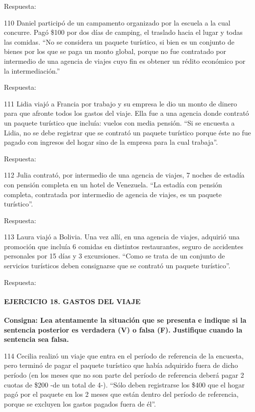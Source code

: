\documentclass[
  openany]{book}
\begin{document}
Respuesta:

110 Daniel participó de un campamento organizado por la escuela a la cual concurre. Pagó \$100 por dos días de camping, el traslado hacia el lugar y todas las comidas. ``No se considera un paquete turístico, si bien es un conjunto de bienes por los que se paga un monto global, porque no fue contratado por intermedio de una agencia de viajes cuyo fin es obtener un rédito económico por la intermediación.''

Respuesta:

111 Lidia viajó a Francia por trabajo y su empresa le dio un monto de dinero para que afronte todos los gastos del viaje. Ella fue a una agencia donde contrató un paquete turístico que incluía: vuelos con media pensión. ``Si se encuesta a Lidia, no se debe registrar que se contrató un paquete turístico porque éste no fue pagado con ingresos del hogar sino de la empresa para la cual trabaja''.

Respuesta:

112 Julia contrató, por intermedio de una agencia de viajes, 7 noches de estadía con pensión completa en un hotel de Venezuela. ``La estadía con pensión completa, contratada por intermedio de agencia de viajes, es un paquete turístico''.

Respuesta:

113 Laura viajó a Bolivia. Una vez allí, en una agencia de viajes, adquirió una promoción que incluía 6 comidas en distintos restaurantes, seguro de accidentes personales por 15 días y 3 excursiones. ``Como se trata de un conjunto de servicios turísticos deben consignarse que se contrató un paquete turístico''.

Respuesta:

\hypertarget{ejercicio-18.-gastos-del-viaje}{%
\paragraph{\texorpdfstring{\textbf{EJERCICIO 18. GASTOS DEL VIAJE}}{EJERCICIO 18. GASTOS DEL VIAJE}}\label{ejercicio-18.-gastos-del-viaje}}

\textbf{Consigna: Lea atentamente la situación que se presenta e indique si la sentencia posterior es verdadera (V) o falsa (F). Justifique cuando la sentencia sea falsa.}

114 Cecilia realizó un viaje que entra en el período de referencia de la encuesta, pero terminó de pagar el paquete turístico que había adquirido fuera de dicho período (en los meses que no son parte del período de referencia deberá pagar 2 cuotas de \$200 -de un total de 4-). ``Sólo deben registrarse los \$400 que el hogar pagó por el paquete en los 2 meses que están dentro del período de referencia, porque se excluyen los gastos pagados fuera de él''.
\end{document}
